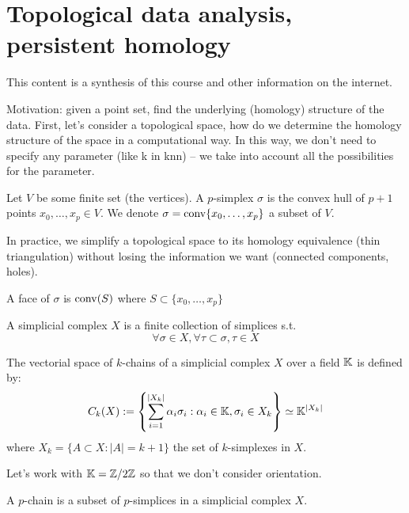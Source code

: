 
\section{Topological data analysis, persistent homology}

This content is a synthesis of this course\cite{INF556} and other
information on the internet.

Motivation: given a point set, find the underlying (homology) structure of
the data. First, let's consider a topological space, how do we determine
the homology structure of the space in a computational way. In this way,
we don't need to specify any parameter (like k in knn) -- we take into account
all the possibilities for the parameter.

\begin{definition}[$p$-simplex ($p\in\N$)]
  Let $V$ be some finite set (the vertices).
  A $p$-simplex $\sigma$ is the convex hull of $p+1$
  points $x_0, \ldots, x_p \in V$.
  We denote $\sigma = \operatorname{conv}\{x_0, \ldots, x_p\}$ a subset of $V$.
\end{definition}
\RM In practice, we simplify a topological space to its homology equivalence (thin
triangulation) without
losing the information we want (connected components, holes).

\begin{definition}[Face]
  A face of $\sigma$ is $\operatorname{conv}(S)$ where $S\subset\{x_0,\ldots, x_p\}$
\end{definition}

\begin{definition}
  A simplicial complex $X$ is a finite collection of simplices s.t.
  $$
  \forall \sigma\in X, \forall \tau\subset\sigma, \tau\in X
  $$
\end{definition}

\begin{definition}
  The vectorial space of $k$-chains of a simplicial complex $X$ over a field $\mathbb{K}$ is defined by:
  $$
  C_k(X) := \left\{\sum_{i=1}^{\left|X_k\right|} \alpha_i \sigma_i: \alpha_i \in \mathbb{K}, \sigma_i \in X_k\right\}
  \simeq \mathbb{K}^{|X_k|}
  $$
  where $X_k = \{A\subset X : |A|=k+1\}$ the set of $k$-simplexes in $X$.
\end{definition}
\RM Let's work with $\mathbb{K} = \mathbb{Z}/2\mathbb{Z}$ so that we don't consider orientation.

\begin{definition}[$p$-chain]
  A $p$-chain is a subset of $p$-simplices in a simplicial complex $X$.
\end{definition}

